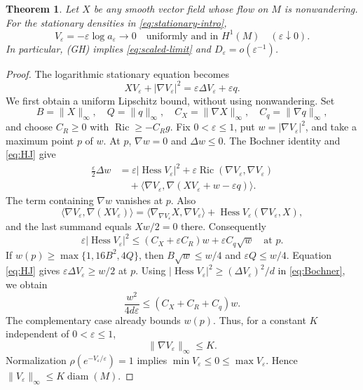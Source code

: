 \documentclass[11pt]{article}
\newtheorem{theorem}{Theorem}[section]
\theoremstyle{definition}
\theoremstyle{remark}
\newcommand{\eps}{\varepsilon}
\DeclareMathOperator{\Hess}{Hess}
\DeclareMathOperator{\Ric}{Ric}
\begin{document}
\begin{theorem}\label{thm:scaled}
Let $X$ be any smooth vector field whose flow on $M$ is nonwandering. For the stationary densities in \eqref{eq:stationary-intro},
\begin{equation}\label{eq:scaled-limit}
 V_\eps=-\eps\log a_\eps\longrightarrow0
 \quad\text{uniformly and in }H^1(M)\quad(\eps\downarrow0).
\end{equation}
In particular, (GH) implies \eqref{eq:scaled-limit} and $D_\eps=o(\eps^{-1})$.
\end{theorem}
\begin{proof}
The logarithmic stationary equation becomes
\begin{equation}\label{eq:HJ}
 XV_\eps+|\nabla V_\eps|^2=\eps\Delta V_\eps+\eps q.
\end{equation}
We first obtain a uniform Lipschitz bound, without using nonwandering. Set
\[
 B=\|X\|_\infty,\quad Q=\|q\|_\infty,\quad
 C_X=\|\nabla X\|_\infty,\quad C_q=\|\nabla q\|_\infty,
\]
and choose $C_R\ge0$ with $\Ric\ge-C_Rg$. Fix $0<\eps\le1$, put $w=|\nabla V_\eps|^2$, and take a maximum point $p$ of $w$. At $p$, $\nabla w=0$ and $\Delta w\le0$. The Bochner identity and \eqref{eq:HJ} give
\begin{align*}
 \frac\eps2\Delta w
 &=\eps|\Hess V_\eps|^2+\eps\Ric(\nabla V_\eps,\nabla V_\eps)\\
 &\quad+\langle\nabla V_\eps,\nabla(XV_\eps+w-\eps q)\rangle.
\end{align*}
The term containing $\nabla w$ vanishes at $p$. Also
\[
 \langle\nabla V_\eps,\nabla(XV_\eps)\rangle
 =\langle\nabla_{\nabla V_\eps}X,\nabla V_\eps\rangle
   +\Hess V_\eps(\nabla V_\eps,X),
\]
and the last summand equals $Xw/2=0$ there. Consequently
\begin{equation}\label{eq:Bochner}
 \eps|\Hess V_\eps|^2\le(C_X+\eps C_R)w+\eps C_q\sqrt w
 \quad\text{at }p.
\end{equation}
If $w(p)\ge\max\{1,16B^2,4Q\}$, then $B\sqrt w\le w/4$ and $\eps Q\le w/4$. Equation \eqref{eq:HJ} gives $\eps\Delta V_\eps\ge w/2$ at $p$. Using $|\Hess V_\eps|^2\ge(\Delta V_\eps)^2/d$ in \eqref{eq:Bochner}, we obtain
\[
 \frac{w^2}{4d\eps}\le(C_X+C_R+C_q)w.
\]
The complementary case already bounds $w(p)$. Thus, for a constant $K$ independent of $0<\eps\le1$,
\begin{equation}\label{eq:Lipschitz}
 \|\nabla V_\eps\|_\infty\le K.
\end{equation}
Normalization $\rho(e^{-V_\eps/\eps})=1$ implies
$\min V_\eps\le0\le\max V_\eps$. Hence
$\|V_\eps\|_\infty\le K\operatorname{diam}(M)$.


\end{proof}
\end{document}
